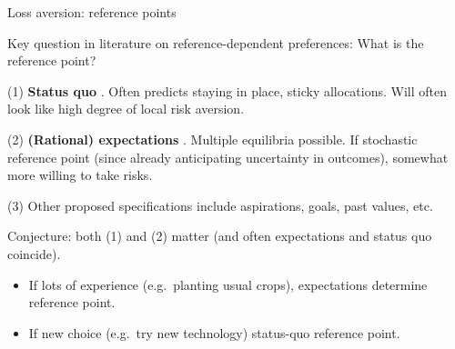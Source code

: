 \documentclass[aspectratio=169, 10pt, handout]{beamer}
\newenvironment{wideitemize}{\itemize\addtolength{\itemsep}{10pt}}{\enditemize}
\begin{document}
\begin{frame}{Loss aversion: reference points}

\begin{wideitemize}

	\item Key question in literature on reference-dependent preferences: What is the reference point? 
	
	\begin{wideitemize}
	    
	    \smallskip
	    
	    \item[(1)] \textbf{Status quo} \citep{kahneman47l979}.
	    Often predicts staying in place, sticky allocations. Will often look like high degree of local risk aversion.
	   
	   \item[(2)] \textbf{(Rational) expectations} \citep{kHoszegi2006model,kHoszegi2007reference}.
	   Multiple equilibria possible. If stochastic reference point (since already anticipating uncertainty in outcomes), somewhat more willing to take risks. 
	
	    \item[(3)] Other proposed specifications include aspirations, goals, past values, etc.
	        
	\end{wideitemize}

	\item Conjecture: both (1) and (2) matter (and often expectations and status quo coincide). 
	
	\begin{itemize}
	
	    \item If lots of experience (e.g.\ planting usual crops), expectations determine reference point. 
	    
	    \item If new choice (e.g.\ try new technology) status-quo reference point. 

    \end{itemize}

\end{wideitemize}

\end{frame}
\end{document}
